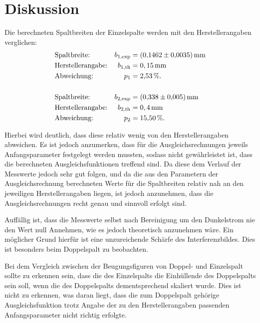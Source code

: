 \section{Diskussion}
\label{sec:Diskussion}

Die berechneten Spaltbreiten der Einzelspalte werden mit den Herstellerangaben verglichen:
\begin{align*}
  &\text{Spaltbreite:} & b_\text{1,exp} &= (\num{0.1462 +- 0.0035})\,\si{\milli\meter} \\
  &\text{Herstellerangabe:} & b_\text{1,th} &= 0,15\,\si{\milli\meter} \\
  &\text{Abweichung:} & p_1 &= \num{2,53}\,\%.\\ \\
  &\text{Spaltbreite:} & b_\text{2,exp} &= (\num{0.338 +- 0.005}) \,\si{\milli\meter} \\
  &\text{Herstellerangabe:} & b_\text{2,th} &= 0,4\,\si{\milli\meter} \\
  &\text{Abweichung:} & p_2 &= \num{15,50}\,\%.
\end{align*}

Hierbei wird deutlich, dass diese relativ wenig von den Herstellerangaben abweichen.
Es ist jedoch anzumerken, dass für die Ausgleichsrechnungen jeweils Anfangsparameter festgelegt
werden mussten, sodass nicht gewährleistet ist, dass die berechneten Ausgleichsfunktionen
treffend sind. Da diese dem Verlauf der Messwerte jedoch sehr gut folgen, und da
die aus den Parametern der Ausgleichsrechnung berechneten Werte für die Spaltbreiten
relativ nah an den jeweiligen Herstellerangaben liegen, ist jedoch
anzunehmen, dass die Ausgleichsrechnungen recht genau und sinnvoll erfolgt sind.

Auffällig ist, dass die Messwerte selbst nach Bereinigung um den Dunkelstrom nie
den Wert null Annehmen, wie es jedoch theoretisch anzunehmen wäre. Ein möglicher Grund
hierfür ist eine unzureichende Schärfe des Interferenzbildes. Dies ist besonders beim
Doppelspalt zu beobachten.

Bei dem Vergleich zwischen der Beugungsfiguren von Doppel- und Einzelspalt sollte zu
erkennen sein, dass die des Einzelspalts die Einhüllende des Doppelspalts sein soll, wenn die
des Doppelspalts dementsprechend skaliert wurde. Dies ist nicht zu erkennen, was  
daran liegt, dass die zum Doppelspalt gehörige Ausgleichsfunktion 
trotz Angabe der zu den Herstellerangaben passenden
Anfangsparameter nicht richtig erfolgte.



